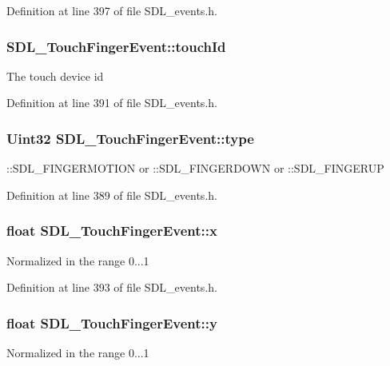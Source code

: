 Definition at line 397 of file S\+D\+L\+\_\+events.\+h.

\hypertarget{structSDL__TouchFingerEvent_ad7a6f39ec9af1bf47b160d18314edd70}{
\subsubsection[{touch\+Id}]{ S\+D\+L\+\_\+\+Touch\+Finger\+Event\+::touch\+Id}}\label{structSDL__TouchFingerEvent_ad7a6f39ec9af1bf47b160d18314edd70}
The touch device id 

Definition at line 391 of file S\+D\+L\+\_\+events.\+h.

\hypertarget{structSDL__TouchFingerEvent_a3883218fa3426065ca66086c100edbfa}{
\subsubsection[{type}]{\setlength{\rightskip}{0pt plus 5cm}Uint32 S\+D\+L\+\_\+\+Touch\+Finger\+Event\+::type}}\label{structSDL__TouchFingerEvent_a3883218fa3426065ca66086c100edbfa}
\+::\+S\+D\+L\+\_\+\+F\+I\+N\+G\+E\+R\+M\+O\+T\+I\+O\+N or \+::\+S\+D\+L\+\_\+\+F\+I\+N\+G\+E\+R\+D\+O\+W\+N or \+::\+S\+D\+L\+\_\+\+F\+I\+N\+G\+E\+R\+U\+P 

Definition at line 389 of file S\+D\+L\+\_\+events.\+h.

\hypertarget{structSDL__TouchFingerEvent_a0ce44b1342220fa17e9b9b4a77c2c906}{
\subsubsection[{x}]{\setlength{\rightskip}{0pt plus 5cm}float S\+D\+L\+\_\+\+Touch\+Finger\+Event\+::x}}\label{structSDL__TouchFingerEvent_a0ce44b1342220fa17e9b9b4a77c2c906}
Normalized in the range 0...1 

Definition at line 393 of file S\+D\+L\+\_\+events.\+h.

\hypertarget{structSDL__TouchFingerEvent_ac2bb8af638d2927a8e13f6ffe8f9384e}{
\subsubsection[{y}]{\setlength{\rightskip}{0pt plus 5cm}float S\+D\+L\+\_\+\+Touch\+Finger\+Event\+::y}}\label{structSDL__TouchFingerEvent_ac2bb8af638d2927a8e13f6ffe8f9384e}
Normalized in the range 0...1 

